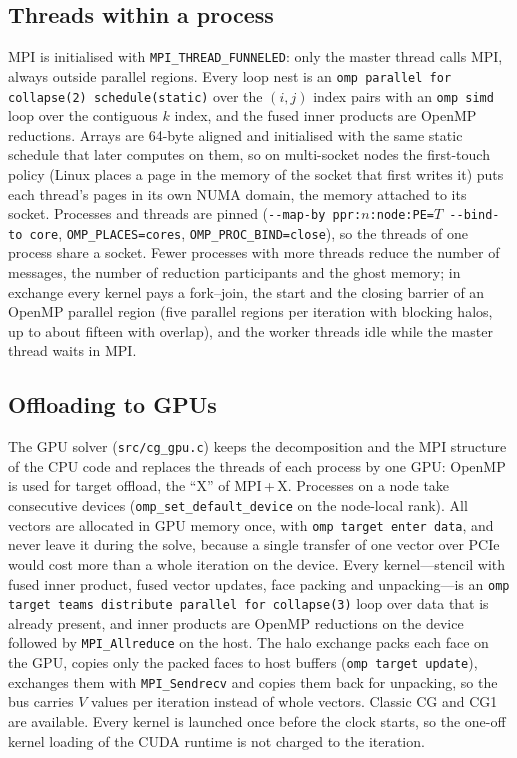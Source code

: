 \documentclass[10pt,a4paper]{article}
\newcommand{\code}[1]{\texttt{#1}}
\begin{document}
\subsection{Threads within a process}\label{sec:threads}
MPI is initialised with \code{MPI\_THREAD\_FUNNELED}: only the master thread calls MPI, always outside
parallel regions. Every loop nest is an \code{omp parallel for collapse(2) schedule(static)} over the
$(i,j)$ index pairs with an \code{omp simd} loop over the contiguous $k$ index, and the fused inner
products are OpenMP reductions. Arrays are 64-byte aligned and initialised with the same static schedule
that later computes on them, so on multi-socket nodes the first-touch policy (Linux places a page in the memory
of the socket that first writes it) puts each thread's pages in its own NUMA domain, the memory attached to
its socket. Processes and threads are pinned (\code{-{}-map-by ppr:$n$:node:PE=$T$
-{}-bind-to core}, \code{OMP\_PLACES=cores}, \code{OMP\_PROC\_BIND=close}), so the threads of one process
share a socket. Fewer processes with more threads reduce the number of messages, the number of reduction
participants and the ghost memory; in exchange every kernel pays a fork--join, the start and the closing barrier
of an OpenMP parallel region (five parallel regions per
iteration with blocking halos, up to about fifteen with overlap), and the worker threads idle while the
master thread waits in MPI.

\subsection{Offloading to GPUs}\label{sec:gpu-design}
The GPU solver (\code{src/cg\_gpu.c}) keeps the decomposition and the MPI structure of the CPU code and
replaces the threads of each process by one GPU: OpenMP is used for target offload, the ``X'' of
MPI\,+\,X. Processes on a node take consecutive devices (\code{omp\_set\_default\_device} on the node-local
rank). All vectors are allocated in GPU memory once, with \code{omp target enter data}, and never leave it
during the solve, because a single transfer of one vector over PCIe would cost more than a whole iteration
on the device. Every kernel---stencil with fused inner product, fused vector updates, face packing and
unpacking---is an \code{omp target teams distribute parallel for collapse(3)} loop over data that is
already present, and inner products are OpenMP reductions on the device followed by \code{MPI\_Allreduce}
on the host. The halo exchange packs each face on the GPU, copies only the packed faces to host buffers
(\code{omp target update}), exchanges them with \code{MPI\_Sendrecv} and copies them back for unpacking, so
the bus carries $V$ values per iteration instead of whole vectors. Classic CG and CG1 are available. Every
kernel is launched once before the clock starts, so the one-off kernel loading of the CUDA runtime is not
charged to the iteration.
\end{document}
